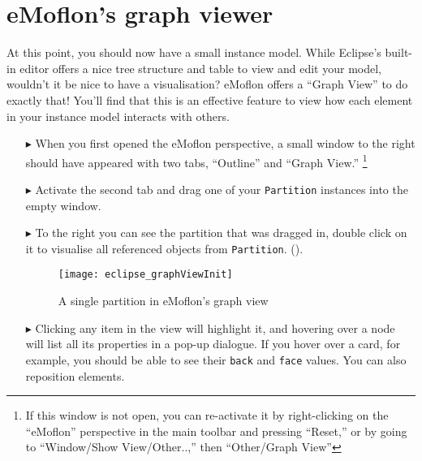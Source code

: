 \newpage
\section{eMoflon's graph viewer}
\genHeader

At this point, you should now have a small instance model. While Eclipse's built-in editor offers a nice tree structure and table to view and edit your model,
wouldn't it be nice to have a visualisation? eMoflon offers a ``Graph View'' to do exactly that! You'll find that this is an effective
feature to view how each element in your instance model interacts with others.

\begin{itemize}

\item[$\blacktriangleright$] When you first opened the eMoflon perspective, a small window to the right should have appeared with two tabs, ``Outline'' and
``Graph View.'' \footnote{If this window is not open, you can re-activate it by right-clicking on the ``eMoflon'' perspective in the main toolbar and pressing
``Reset,'' or by going to ``Window/Show View/Other..,'' then ``Other/Graph View''} 

\item[$\blacktriangleright$] Activate the second tab and drag one of your \texttt{Partition} instances into the empty window. 

\item[$\blacktriangleright$] To the right you can see the partition that was dragged in, double click on it to visualise all referenced objects from \texttt{Partition}.
().

\vspace{0.5cm}

\begin{figure}[htbp]
	\centering
  \texttt{[image: eclipse\_graphViewInit]}
	\caption{A single partition in eMoflon's graph view}
	\label{eclipse:graphView_init}
\end{figure}

\vspace{0.5cm}

\item[$\blacktriangleright$] Clicking any item in the view will highlight it, and hovering over a node will list all its properties in a pop-up dialogue. If you
hover over a card, for example, you should be able to see their \texttt{back} and \texttt{face} values. You can also reposition elements.


\end{itemize}
